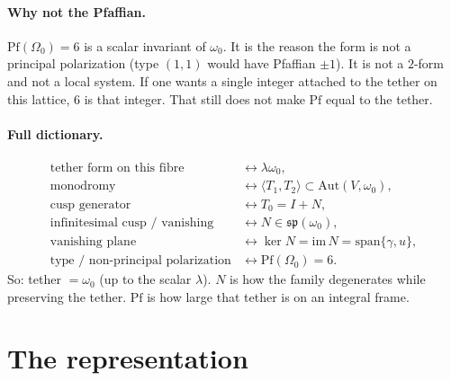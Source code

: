 \documentclass[11pt,a4paper]{article}
\theoremstyle{definition}
\theoremstyle{remark}
\newcommand{\Pf}{\mathrm{Pf}}
\newcommand{\Aut}{\mathrm{Aut}}
\newcommand{\spq}{\mathfrak{sp}}
\begin{document}
\paragraph{Why not the Pfaffian.}
$\Pf(\Omega_0)=6$ is a scalar invariant of $\omega_0$. It is the reason the form is not a principal polarization (type $(1,1)$ would have Pfaffian $\pm 1$). It is not a $2$-form and not a local system. If one wants a single integer attached to the tether on this lattice, $6$ is that integer. That still does not make $\Pf$ equal to the tether.

\paragraph{Full dictionary.}
\begin{align*}
\text{tether form on this fibre} &\longleftrightarrow \lambda\omega_0,\\
\text{monodromy} &\longleftrightarrow \langle T_1,T_2\rangle\subset\Aut(V,\omega_0),\\
\text{cusp generator} &\longleftrightarrow T_0=I+N,\\
\text{infinitesimal cusp / vanishing} &\longleftrightarrow N\in\spq(\omega_0),\\
\text{vanishing plane} &\longleftrightarrow \ker N=\mathrm{im}\,N=\mathrm{span}\{\gamma,u\},\\
\text{type / non-principal polarization} &\longleftrightarrow \Pf(\Omega_0)=6.
\end{align*}
So: tether $=\omega_0$ (up to the scalar $\lambda$). $N$ is how the family degenerates while preserving the tether. $\Pf$ is how large that tether is on an integral frame.

\section{The representation}
\end{document}
